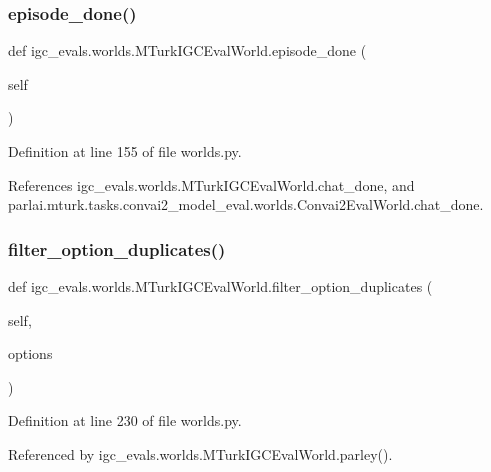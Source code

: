 \subsubsection{\texorpdfstring{episode\+\_\+done()}{episode\_done()}}
{\footnotesize\ttfamily def igc\+\_\+evals.\+worlds.\+M\+Turk\+I\+G\+C\+Eval\+World.\+episode\+\_\+done (\begin{DoxyParamCaption}\item[{}]{self }\end{DoxyParamCaption})}



Definition at line 155 of file worlds.\+py.



References igc\+\_\+evals.\+worlds.\+M\+Turk\+I\+G\+C\+Eval\+World.\+chat\+\_\+done, and parlai.\+mturk.\+tasks.\+convai2\+\_\+model\+\_\+eval.\+worlds.\+Convai2\+Eval\+World.\+chat\+\_\+done.

\mbox{\label{classigc__evals_1_1worlds_1_1MTurkIGCEvalWorld_a93a8b179951ffcfac7c07da5da696e39}} 
\subsubsection{\texorpdfstring{filter\+\_\+option\+\_\+duplicates()}{filter\_option\_duplicates()}}
{\footnotesize\ttfamily def igc\+\_\+evals.\+worlds.\+M\+Turk\+I\+G\+C\+Eval\+World.\+filter\+\_\+option\+\_\+duplicates (\begin{DoxyParamCaption}\item[{}]{self,  }\item[{}]{options }\end{DoxyParamCaption})}



Definition at line 230 of file worlds.\+py.



Referenced by igc\+\_\+evals.\+worlds.\+M\+Turk\+I\+G\+C\+Eval\+World.\+parley().

